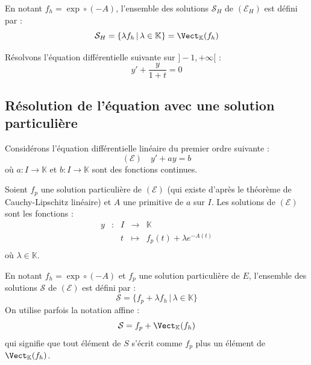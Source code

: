 \documentclass[french,11pt,twoside]{VcCours}
\begin{document}
\begin{Demonstration}{}

\vspace*{4cm}
\end{Demonstration}

\begin{Remarque}{} En notant $f_h=\exp \circ (-A)$, l'ensemble des solutions $\mathcal{S}_H$ de $(\mathcal{E}_H)$ est défini par :
$$ \mathcal{S}_H = \lbrace \lambda f_h \, \vert \, \lambda \in \mathbb{K} \rbrace = \Vect_{\mathbb{K}}(f_h)$$
\end{Remarque}

\begin{Exemple} Résolvons l'équation différentielle suivante sur $]-1, + \infty[$ :
$$ y'+ \frac{y}{1+t}= 0 $$

\vspace*{4cm}
\end{Exemple}

\subsection{Résolution de l'équation avec une solution particulière}
Considérons l'équation différentielle linéaire du premier ordre suivante : 
$$(\mathcal{E}) \quad  y'+a y= b $$
où $a : I \rightarrow \mathbb{K}$ et $b : I \rightarrow \mathbb{K}$ sont des fonctions continues.

\begin{Proposition}{} Soient $f_p$ une solution particulière de $(\mathcal{E})$ (qui existe d'après le théorème de Cauchy-Lipschitz linéaire) et $A$ une primitive de $a$ sur $I$. Les solutions de $(\mathcal{E})$ sont les fonctions :
$$ \begin{array}{cclcl}
y & : & I & \rightarrow & \mathbb{K} \\
 & & t & \mapsto &  f_p(t) +\lambda e^{-A(t)} \\
\end{array}$$
où $\lambda \in \mathbb{K}$.
\end{Proposition}

\begin{Demonstration}{}

\vspace*{4cm}
\end{Demonstration}

\begin{Remarque}{} En notant $f_h=\exp \circ (-A)$ et $f_p$ une solution particulière de $E$, l'ensemble des solutions $\mathcal{S}$ de $(\mathcal{E})$ est défini par :
$$ \mathcal{S} = \lbrace f_p + \lambda f_h  \, \vert \, \lambda \in \mathbb{K} \rbrace$$
On utilise parfois la notation affine :
$$  \mathcal{S} = f_p + \Vect_{\mathbb{K}}(f_h)$$
qui signifie que tout élément de $S$ s'écrit comme $f_p$ plus un élément de $\Vect_{\mathbb{K}}(f_h)$.
\end{Remarque}
\end{document}
